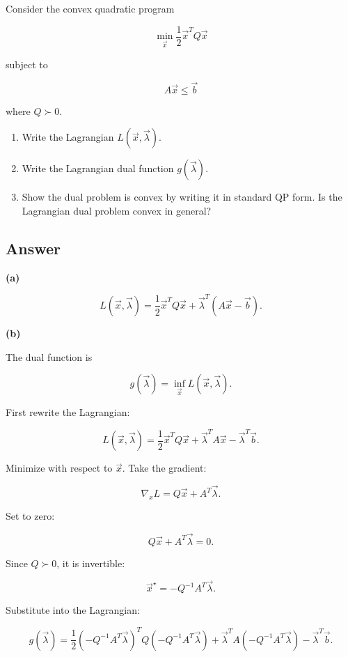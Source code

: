 \documentclass[
	12pt,
]{fphw}
\begin{document}
Consider the convex quadratic program

\[
\min_{\vec{x}} \frac{1}{2}\vec{x}^TQ\vec{x}
\]

subject to

\[
A\vec{x} \le \vec{b}
\]

where $Q\succ0$.

\begin{enumerate}
\item[(a)] Write the Lagrangian $L(\vec{x},\vec{\lambda})$.

\item[(b)] Write the Lagrangian dual function $g(\vec{\lambda})$.

\item[(c)] Show the dual problem is convex by writing it in standard QP form. Is the Lagrangian dual problem convex in general?
\end{enumerate}

\subsection*{Answer}

\textbf{(a)}

\[
L(\vec{x},\vec{\lambda})
=
\frac{1}{2}\vec{x}^T Q \vec{x}
+
\vec{\lambda}^T(A\vec{x}-\vec{b}).
\]

\bigskip

\textbf{(b)}

The dual function is

\[
g(\vec{\lambda}) = \inf_{\vec{x}} L(\vec{x},\vec{\lambda}).
\]

First rewrite the Lagrangian:

\[
L(\vec{x},\vec{\lambda})
=
\frac{1}{2}\vec{x}^T Q \vec{x}
+
\vec{\lambda}^T A \vec{x}
-
\vec{\lambda}^T \vec{b}.
\]

Minimize with respect to $\vec{x}$.  
Take the gradient:

\[
\nabla_x L = Q\vec{x} + A^T\vec{\lambda}.
\]

Set to zero:

\[
Q\vec{x} + A^T\vec{\lambda} = 0.
\]

Since $Q \succ 0$, it is invertible:

\[
\vec{x}^\star = -Q^{-1}A^T\vec{\lambda}.
\]

Substitute into the Lagrangian:

\[
g(\vec{\lambda})
=
\frac{1}{2}(-Q^{-1}A^T\vec{\lambda})^T
Q
(-Q^{-1}A^T\vec{\lambda})
+
\vec{\lambda}^T A (-Q^{-1}A^T\vec{\lambda})
-
\vec{\lambda}^T\vec{b}.
\]
\end{document}
